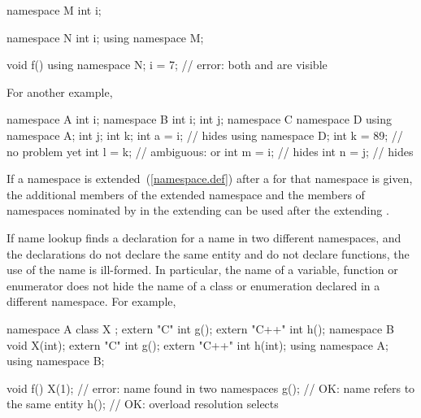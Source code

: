 \begin{codeblock}
namespace M {
  int i;
}

namespace N {
  int i;
  using namespace M;
}

void f() {
  using namespace N;
  i = 7;            // error: both  and  are visible
}
\end{codeblock}

For another example,

\begin{codeblock}
namespace A {
  int i;
}
namespace B {
  int i;
  int j;
  namespace C {
    namespace D {
      using namespace A;
      int j;
      int k;
      int a = i;    //  hides 
    }
    using namespace D;
    int k = 89;     // no problem yet
    int l = k;      // ambiguous:  or 
    int m = i;      //  hides 
    int n = j;      //  hides 
  }
}
\end{codeblock}
\exitexample


\pnum
If a namespace is extended~(\ref{namespace.def}) after a
 for that namespace is given, the additional
members of the extended namespace and the members of namespaces
nominated by  in the
extending  can be used after the
extending .

\pnum
If name lookup finds a declaration for a name in two different
namespaces, and the declarations do not declare the same entity and do
not declare functions, the use of the name is ill-formed.
\enternote
In particular, the name of a variable, function or enumerator does not
hide the name of a class or enumeration declared in a different
namespace. For example,

\begin{codeblock}
namespace A {
  class X { };
  extern "C"   int g();
  extern "C++" int h();
}
namespace B {
  void X(int);
  extern "C"   int g();
  extern "C++" int h(int);
}
using namespace A;
using namespace B;

void f() {
  X(1);             // error: name  found in two namespaces
  g();              // OK: name  refers to the same entity
  h();              // OK: overload resolution selects 
}
\end{codeblock}
\exitnote

